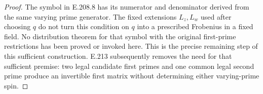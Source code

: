\begin{proof}
The symbol in E.208.8 has its numerator and
denominator derived from the same varying prime
generator. The fixed extensions $L_z,L_w$ used
after choosing $q$ do not turn this condition on
$q$ into a prescribed Frobenius in a fixed field.
No distribution theorem for that symbol with the
original first-prime restrictions has been proved
or invoked here. This is the precise remaining
step of this sufficient construction. E.213 subsequently
removes the need for that sufficient premise: two legal
candidate first primes and one common legal second prime
produce an invertible first matrix without determining
either varying-prime spin.
\end{proof}

